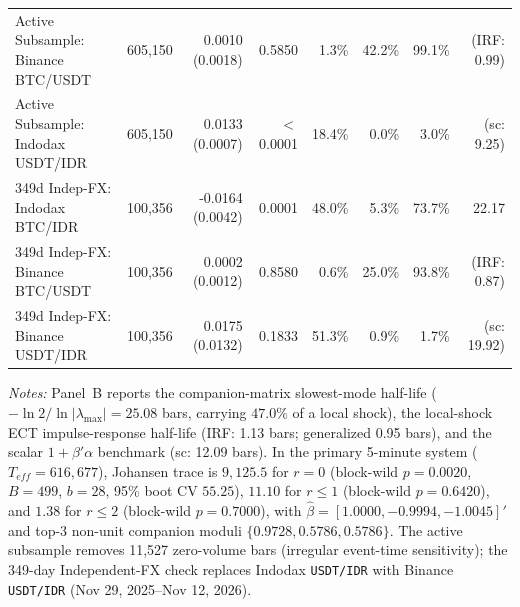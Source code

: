 \begin{table}[htbp]
\begin{tabular}{@{}>{\raggedright\arraybackslash}p{2.35cm}rrrrrrr@{}}
Active Subsample: Binance BTC/USDT & 605,150 & 0.0010 (0.0018) & 0.5850 & 1.3\% & 42.2\% & 99.1\% & (IRF: 0.99) \\
Active Subsample: Indodax USDT/IDR & 605,150 & 0.0133 (0.0007) & $<$0.0001 & 18.4\% & 0.0\% & 3.0\% & (sc: 9.25) \\
349d Indep-FX: Indodax BTC/IDR & 100,356 & -0.0164 (0.0042) & 0.0001 & 48.0\% & 5.3\% & 73.7\% & 22.17 \\
349d Indep-FX: Binance BTC/USDT & 100,356 & 0.0002 (0.0012) & 0.8580 & 0.6\% & 25.0\% & 93.8\% & (IRF: 0.87) \\
349d Indep-FX: Binance USDT/IDR & 100,356 & 0.0175 (0.0132) & 0.1833 & 51.3\% & 0.9\% & 1.7\% & (sc: 19.92) \\
\bottomrule
\end{tabular}\endgroup
\begin{minipage}{\textwidth}\footnotesize\vspace{3pt}
\emph{Notes:} Panel~B reports the companion-matrix slowest-mode half-life ($-\ln 2/\ln|\lambda_{\max}| = 25.08$ bars, carrying $47.0\%$ of a local shock), the local-shock ECT impulse-response half-life (IRF: 1.13 bars; generalized 0.95 bars), and the scalar $1+\beta'\alpha$ benchmark (sc: 12.09 bars). In the primary 5-minute system ($T_{eff}=616,677$), Johansen trace is $9,125.5$ for $r=0$ (block-wild $p=0.0020$, $B=499$, $b=28$, 95\% boot CV $55.25$), $11.10$ for $r\le 1$ (block-wild $p=0.6420$), and $1.38$ for $r\le 2$ (block-wild $p=0.7000$), with $\hat{\beta} = [1.0000, -0.9994, -1.0045]'$ and top-3 non-unit companion moduli $\{0.9728, 0.5786, 0.5786\}$. The active subsample removes 11,527 zero-volume bars (irregular event-time sensitivity); the 349-day Independent-FX check replaces Indodax \texttt{USDT/IDR} with Binance \texttt{USDT/IDR} (Nov 29, 2025--Nov 12, 2026).
\end{minipage}
\end{table}
